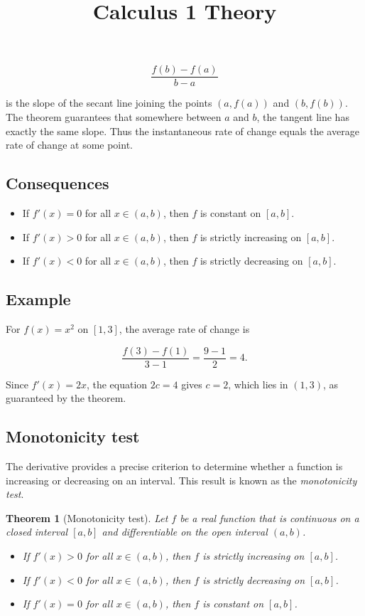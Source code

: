 \documentclass[11pt,a4paper]{article} \usepackage[T1]{fontenc}
\theoremstyle{plain} \newtheorem{theorem}{Theorem} \title{Calculus 1 Theory}
\begin{document}
\[
\frac{f(b)-f(a)}{b-a}
\]

is the slope of the secant line joining the points $(a,f(a))$ and $(b,f(b))$.
The theorem guarantees that somewhere between $a$ and $b$, the tangent line has
exactly the same slope. Thus the instantaneous rate of change equals the
average rate of change at some point.

\subsection*{Consequences}

\begin{itemize}
\item If $f'(x)=0$ for all $x\in(a,b)$, then $f$ is constant on $[a,b]$.
\item If $f'(x)>0$ for all $x\in(a,b)$, then $f$ is strictly increasing on
$[a,b]$.
\item If $f'(x)<0$ for all $x\in(a,b)$, then $f$ is strictly decreasing on
$[a,b]$.
\end{itemize}

\subsection*{Example}

For $f(x)=x^2$ on $[1,3]$, the average rate of change is

\[
\frac{f(3)-f(1)}{3-1} = \frac{9-1}{2} = 4.
\]

Since $f'(x)=2x$, the equation $2c=4$ gives $c=2$, which lies in $(1,3)$, as
guaranteed by the theorem.

\subsection {Monotonicity test}

The derivative provides a precise criterion to determine whether a function is
increasing or decreasing on an interval. This result is known as the
\emph{monotonicity test}.

\begin{theorem}
[Monotonicity test] Let $f$ be a real function that is continuous on a closed
interval $[a,b]$ and differentiable on the open interval $(a,b)$.

\begin{itemize}
\item If $f'(x) > 0$ for all $x \in (a,b)$, then $f$ is strictly increasing on
$[a,b]$.
\item If $f'(x) < 0$ for all $x \in (a,b)$, then $f$ is strictly decreasing on
$[a,b]$.
\item If $f'(x) = 0$ for all $x \in (a,b)$, then $f$ is constant on $[a,b]$.
\end{itemize}

\end{theorem}
\end{document}
